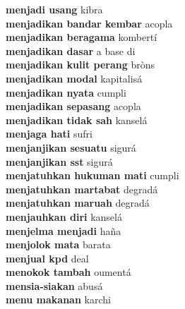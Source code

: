 \textbf{ menjadi usang  } kibra \\
\textbf{ menjadikan bandar kembar  } acopla \\
\textbf{ menjadikan beragama  } kombertí \\
\textbf{ menjadikan dasar  } a base di \\
\textbf{ menjadikan kulit perang  } bròns \\
\textbf{ menjadikan modal  } kapitalisá \\
\textbf{ menjadikan nyata  } cumpli \\
\textbf{ menjadikan sepasang  } acopla \\
\textbf{ menjadikan tidak sah  } kanselá \\
\textbf{ menjaga hati  } sufri \\
\textbf{ menjanjikan sesuatu  } sigurá \\
\textbf{ menjanjikan sst  } sigurá \\
\textbf{ menjatuhkan hukuman mati  } cumpli \\
\textbf{ menjatuhkan martabat  } degradá \\
\textbf{ menjatuhkan maruah  } degradá \\
\textbf{ menjauhkan diri  } kanselá \\
\textbf{ menjelma menjadi  } haña \\
\textbf{ menjolok mata  } barata \\
\textbf{ menjual kpd  } deal \\
\textbf{ menokok tambah  } oumentá \\
\textbf{ mensia-siakan  } abusá \\
\textbf{ menu makanan  } karchi \\
